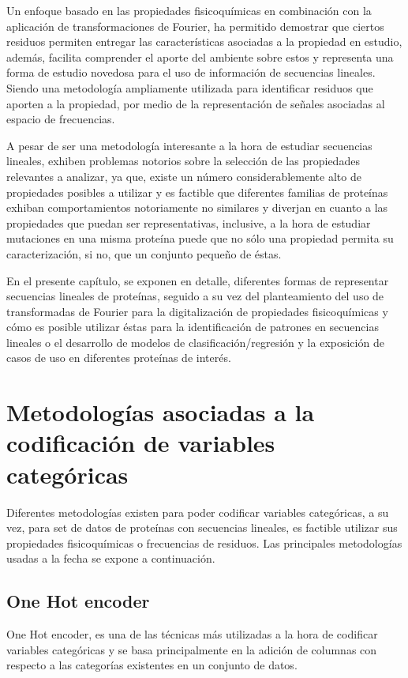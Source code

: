 Un enfoque basado en las propiedades fisicoquímicas en combinación con la aplicación de transformaciones de Fourier, ha permitido demostrar que ciertos residuos permiten entregar las características asociadas a la propiedad en estudio, además, facilita comprender el aporte del ambiente sobre estos y representa una forma de estudio novedosa para el uso de información de secuencias lineales. Siendo una metodología ampliamente utilizada para identificar residuos que aporten a la propiedad, por medio de la representación de señales asociadas al espacio de frecuencias.

A pesar de ser una metodología interesante a la hora de estudiar secuencias lineales, exhiben problemas notorios sobre la selección de las propiedades relevantes a analizar, ya que, existe un número considerablemente alto de propiedades posibles a utilizar y es factible que diferentes familias de proteínas exhiban comportamientos notoriamente no similares y diverjan en cuanto a las propiedades que puedan ser representativas, inclusive, a la hora de estudiar mutaciones en una misma proteína puede que no sólo una propiedad permita su caracterización, si no, que un conjunto pequeño de éstas.

En el presente capítulo, se exponen en detalle, diferentes formas de representar secuencias lineales de proteínas, seguido a su vez del planteamiento del uso de transformadas de Fourier para la digitalización de propiedades fisicoquímicas y cómo es posible utilizar éstas para la identificación de patrones en secuencias lineales o el desarrollo de modelos de clasificación/regresión y la exposición de casos de uso en diferentes proteínas de interés. 

\section{Metodologías asociadas a la codificación de variables categóricas}

Diferentes metodologías existen para poder codificar variables categóricas, a su vez, para set de datos de proteínas con secuencias lineales, es factible utilizar sus propiedades fisicoquímicas o frecuencias de residuos. Las principales metodologías usadas a la fecha se expone a continuación.

\subsection{One Hot encoder}

One Hot encoder, es una de las técnicas más utilizadas a la hora de codificar variables categóricas y se basa principalmente en la adición de columnas con respecto a las categorías existentes en un conjunto de datos.

